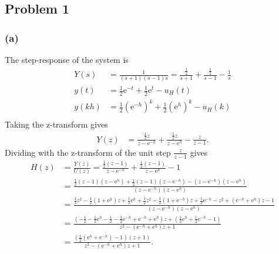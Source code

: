 \documentclass[letterpaper,12pt]{article}
\begin{document}
\subsection*{Problem 1}

\subsubsection*{(a)}
The step-response of the system is 
\begin{equation*}
\begin{split}
Y(s) &= \frac{1}{(s+1)(s-1)s} = \frac{\frac{1}{2}}{s+1} + \frac{\frac{1}{2}}{s-1} - \frac{1}{s}\\
y(t) &= \frac{1}{2} \mathrm{e}^{-t} + \frac{1}{2} \mathrm{e}^{t} - u_H(t)\\
y(kh) &= \frac{1}{2} \left(\mathrm{e}^{-h}\right)^k + \frac{1}{2} \left(\mathrm{e}^{h}\right)^k - u_H(k)\\
\end{split}
\end{equation*}
Taking the z-transform gives
\begin{equation*}
\begin{split}
Y(z) &= \frac{\frac{1}{2}z}{z - \mathrm{e}^{-h}} + \frac{\frac{1}{2}z}{z - \mathrm{e}^{h}} - \frac{z}{z-1}.
\end{split} 
\end{equation*}
Dividing with the z-transform of the unit step \(\frac{z}{z-1}\) gives
\begin{equation*}
\begin{split}
H(z) &= \frac{Y(z)}{U(z)} = \frac{\frac{1}{2}(z-1)}{z - \mathrm{e}^{-h}} + \frac{\frac{1}{2}(z-1)}{z - \mathrm{e}^{h}} - 1 \\
&= \frac{ \frac{1}{2} (z-1)(z-\mathrm{e}^{h}) + \frac{1}{2}(z-1)(z - \mathrm{e}^{-h}) - (z-\mathrm{e}^{-h})(z - \mathrm{e}^h)}{(z-\mathrm{e}^{-h})(z - \mathrm{e}^h)}\\
&= \frac{ \frac{1}{2}z^2 - \frac{1}{2}(1+\mathrm{e}^{h})z + \frac{1}{2}\mathrm{e}^{h} + \frac{1}{2}z^2 -\frac{1}{2}(1 + \mathrm{e}^{-h})z + \frac{1}{2}\mathrm{e}^{-h} - z^2 + (\mathrm{e}^{-h} + \mathrm{e}^{h})z - 1}{(z-\mathrm{e}^{-h})(z - \mathrm{e}^h)}\\
&= \frac{ (-\frac{1}{2} -\frac{1}{2}\mathrm{e}^h - \frac{1}{2} - \frac{1}{2}\mathrm{e}^{-h} + \mathrm{e}^{-h} + \mathrm{e}^h) z + (\frac{1}{2}\mathrm{e}^h + \frac{1}{2}\mathrm{e}^{-h} - 1)}{z^2 - (\mathrm{e}^{-h} + \mathrm{e}^{h})z + 1}\\
&= \frac{ (\frac{1}{2}(\mathrm{e}^{h} + \mathrm{e}^{-h}) - 1) (z+1)}{z^2 - (\mathrm{e}^{-h} + \mathrm{e}^{h})z + 1}.
\end{split}
\end{equation*}
\end{document}

